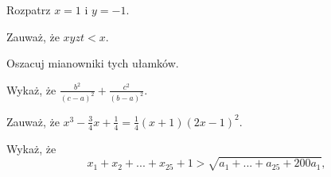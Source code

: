 
\begin{hints_list}
	\item Rozpatrz $x = 1$ i $y = -1$.
	\item Zauważ, że $xyzt < x$.
	\item Oszacuj mianowniki tych ułamków.
	\item Wykaż, że $\frac{b^2}{(c - a)^2} + \frac{c^2}{(b - a)^2}$.
	\item Zauważ, że $x^3 - \frac{3}{4}x + \frac{1}{4} = \frac{1}{4}(x + 1)(2x - 1)^2$.
	\item Wykaż, że
	\[
		x_1 + x_2 + ... + x_{25} + 1 > \sqrt{a_1 + ... + a_{25} + 200a_1},
	\]
\end{hints_list}